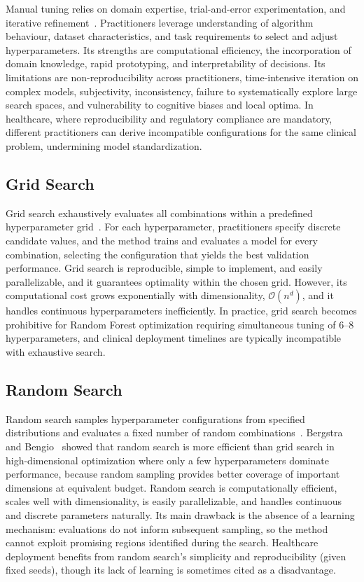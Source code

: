 \documentclass[letterpaper, 10 pt, conference]{ieeeconf}
\begin{document}
Manual tuning relies on domain expertise, trial-and-error experimentation, and iterative refinement~\cite{bischl2023}. Practitioners leverage understanding of algorithm behaviour, dataset characteristics, and task requirements to select and adjust hyperparameters. Its strengths are computational efficiency, the incorporation of domain knowledge, rapid prototyping, and interpretability of decisions. Its limitations are non-reproducibility across practitioners, time-intensive iteration on complex models, subjectivity, inconsistency, failure to systematically explore large search spaces, and vulnerability to cognitive biases and local optima. In healthcare, where reproducibility and regulatory compliance are mandatory, different practitioners can derive incompatible configurations for the same clinical problem, undermining model standardization.

\subsection{Grid Search}

Grid search exhaustively evaluates all combinations within a predefined hyperparameter grid~\cite{elgeldawi2021}. For each hyperparameter, practitioners specify discrete candidate values, and the method trains and evaluates a model for every combination, selecting the configuration that yields the best validation performance. Grid search is reproducible, simple to implement, and easily parallelizable, and it guarantees optimality within the chosen grid. However, its computational cost grows exponentially with dimensionality, $\mathcal{O}(n^d)$, and it handles continuous hyperparameters inefficiently. In practice, grid search becomes prohibitive for Random Forest optimization requiring simultaneous tuning of $6$--$8$ hyperparameters, and clinical deployment timelines are typically incompatible with exhaustive search.

\subsection{Random Search}

Random search samples hyperparameter configurations from specified distributions and evaluates a fixed number of random combinations~\cite{bergstra2012}. Bergstra and Bengio~\cite{bergstra2012} showed that random search is more efficient than grid search in high-dimensional optimization where only a few hyperparameters dominate performance, because random sampling provides better coverage of important dimensions at equivalent budget. Random search is computationally efficient, scales well with dimensionality, is easily parallelizable, and handles continuous and discrete parameters naturally. Its main drawback is the absence of a learning mechanism: evaluations do not inform subsequent sampling, so the method cannot exploit promising regions identified during the search. Healthcare deployment benefits from random search's simplicity and reproducibility (given fixed seeds), though its lack of learning is sometimes cited as a disadvantage.
\end{document}
